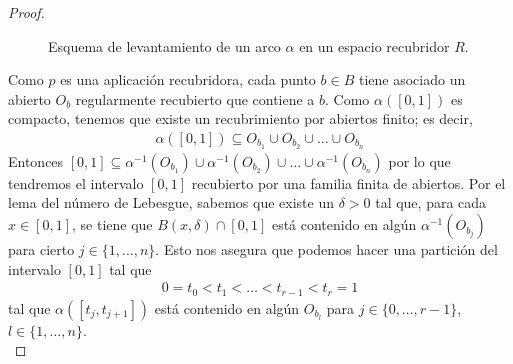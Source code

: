 \begin{lema}
\begin{proof}
\begin{figure}
            \caption{Esquema de levantamiento de un arco $\alpha$ en un espacio recubridor $R$.}
            \label{fig:levantamiento_arco}
        \end{figure}
        Como $p$ es una aplicación recubridora, cada punto $b\in B$ tiene asociado un abierto $O_b$ regularmente recubierto que contiene a $b$. Como $\alpha([0,1])$ es compacto, tenemos que existe un recubrimiento por abiertos finito; es decir,
        \begin{gather*}
            \alpha([0,1]) \subseteq O_{b_1} \cup O_{b_2}\cup \dots \cup O_{b_n}
        \end{gather*}
        Entonces $[0,1]\subseteq \alpha^{-1}( O_{b_1}) \cup \alpha^{-1}(O_{b_2})\cup \dots \cup \alpha^{-1}(O_{b_n})$ por lo que tendremos el intervalo $[0,1]$ recubierto por una familia finita de abiertos. Por el lema del número de Lebesgue, sabemos que existe un $\delta>0$ tal que, para cada $x\in[0,1]$, se tiene que $B(x,\delta)\cap[0,1]$ está contenido en algún $\alpha^{-1}(O_{b_j})$ para cierto $j\in\{1,\dots,n\}$. Esto nos asegura que podemos hacer una partición del intervalo $[0,1]$ tal que
        \begin{gather*}
            0 = t_0 < t_1 < \dots < t_{r-1} < t_r = 1
        \end{gather*}
        tal que $\alpha([t_j, t_{j+1}])$ está contenido en algún $O_{b_l}$ para $j\in\{0,\dots,r-1\}$, $l\in\{1,\dots,n\}$.\\


\end{proof}
\end{lema}
